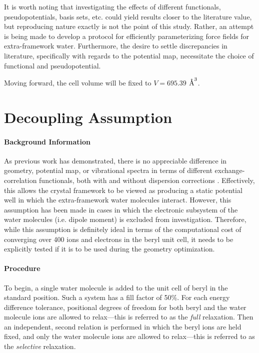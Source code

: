        It is worth noting that investigating the effects of different functionals, pseudopotentials, basis sets, etc. could yield results closer to the literature value, but reproducing nature exactly is not the point of this study. Rather, an attempt is being made to develop a protocol for efficiently parameterizing force fields for extra-framework water. Furthermore, the desire to settle discrepancies in literature, specifically with regards to the potential map, necessitate the choice of functional and pseudopotential.
        
        Moving forward, the cell volume will be fixed to $V=695.39$ $\text{\normalfont\AA}^3$.
    \section{Decoupling Assumption}
    \label{sec:da}
        \paragraph{Background Information} As previous work has demonstrated, there is no appreciable difference in geometry, potential map, or vibrational spectra in terms of different exchange-correlation functionals, both with and without dispersion corrections \cite{vibr_states}. Effectively, this allows the crystal framework to be viewed as producing a static potential well in which the extra-framework water molecules interact. However, this assumption has been made in cases in which the electronic subsystem of the water molecules (i.e. dipole moment) is excluded from investigation. Therefore, while this assumption is definitely ideal in terms of the computational cost of converging over 400 ions and electrons in the beryl unit cell, it needs to be explicitly tested if it is to be used during the geometry optimization. 
            
        \paragraph{Procedure} To begin, a single water molecule is added to the unit cell of beryl in the standard position. Such a system has a fill factor of 50\%. For each energy difference tolerance, positional degrees of freedom for both beryl and the water molecule ions are allowed to relax---this is referred to as the \textit{full} relaxation. Then an independent, second relation is performed in which the beryl ions are held fixed, and only the water molecule ions are allowed to relax---this is referred to as the \textit{selective} relaxation.
            
